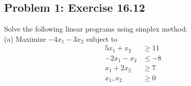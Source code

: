 \documentclass{article}
\begin{document}
 

\hypertarget{}{}
\subsection*{{Problem 1: Exercise 16.12}}
\label{}
Solve the following linear programs using simplex method:\\ 
(a) Maximize $-4x_1 -3x_2$ subject to 
\begin{align*}
5x_1 + x_2 &\geq 11 \\
-2x_1 -x_2  & \leq -8  \\
x_1 + 2x_2 &\geq 7 \\
x_1, x_2 & \geq 0 
\end{align*}
\end{document}
